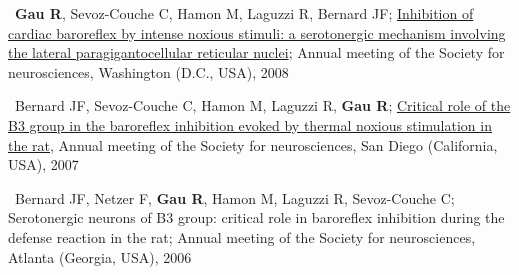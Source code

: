 \textbullet~\textbf{Gau R}, Sevoz-Couche C, Hamon M, Laguzzi R, Bernard JF;
\href{https://osf.io/hxkgv/}{Inhibition of cardiac baroreflex by intense noxious stimuli:
a serotonergic mechanism involving the lateral paragigantocellular reticular nuclei};
Annual meeting of the Society for neurosciences,
Washington (D.C., USA),
2008

\textbullet~Bernard JF, Sevoz-Couche C, Hamon M, Laguzzi R, \textbf{Gau R};
\href{https://osf.io/4rjst/}{Critical role of the B3 group in the baroreflex inhibition evoked
by thermal noxious stimulation in the rat},
Annual meeting of the Society for neurosciences,
San Diego (California, USA),
2007

\textbullet~Bernard JF, Netzer F, \textbf{Gau R}, Hamon M, Laguzzi R, Sevoz-Couche C;
Serotonergic neurons of B3 group: critical role in baroreflex inhibition
during the defense reaction in the rat;
Annual meeting of the Society for neurosciences,
Atlanta (Georgia, USA),
2006
